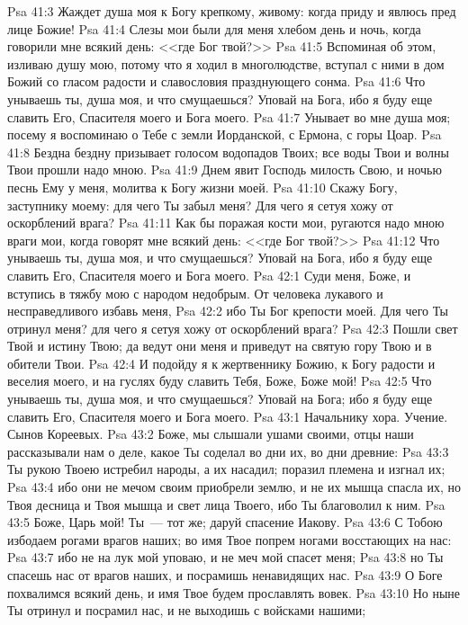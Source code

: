 \vs Psa 41:3 Жаждет душа моя к Богу крепкому, живому: когда приду и явлюсь пред лице Божие!
\vs Psa 41:4 Слезы мои были для меня хлебом день и ночь, когда говорили мне всякий день: <<где Бог твой?>>
\vs Psa 41:5 Вспоминая об этом, изливаю душу мою, потому что я ходил в многолюдстве, вступал с ними в дом Божий со гласом радости и славословия празднующего сонма.
\vs Psa 41:6 Что унываешь ты, душа моя, и что смущаешься? Уповай на Бога, ибо я буду еще славить Его, Спасителя моего и Бога моего.
\vs Psa 41:7 Унывает во мне душа моя; посему я воспоминаю о Тебе с земли Иорданской, с Ермона, с горы Цоар.
\vs Psa 41:8 Бездна бездну призывает голосом водопадов Твоих; все воды Твои и волны Твои прошли надо мною.
\vs Psa 41:9 Днем явит Господь милость Свою, и ночью песнь Ему у меня, молитва к Богу жизни моей.
\vs Psa 41:10 Скажу Богу, заступнику моему: для чего Ты забыл меня? Для чего я сетуя хожу от оскорблений врага?
\vs Psa 41:11 Как бы поражая кости мои, ругаются надо мною враги мои, когда говорят мне всякий день: <<где Бог твой?>>
\vs Psa 41:12 Что унываешь ты, душа моя, и что смущаешься? Уповай на Бога, ибо я буду еще славить Его, Спасителя моего и Бога моего.
\vs Psa 42:1 Суди меня, Боже, и вступись в тяжбу мою с народом недобрым. От человека лукавого и несправедливого избавь меня,
\vs Psa 42:2 ибо Ты Бог крепости моей. Для чего Ты отринул меня? для чего я сетуя хожу от оскорблений врага?
\vs Psa 42:3 Пошли свет Твой и истину Твою; да ведут они меня и приведут на святую гору Твою и в обители Твои.
\vs Psa 42:4 И подойду я к жертвеннику Божию, к Богу радости и веселия моего, и на гуслях буду славить Тебя, Боже, Боже мой!
\vs Psa 42:5 Что унываешь ты, душа моя, и что смущаешься? Уповай на Бога; ибо я буду еще славить Его, Спасителя моего и Бога моего.
\vs Psa 43:1 Начальнику хора. Учение. Сынов Кореевых.
\rsbpar\vs Psa 43:2 Боже, мы слышали ушами своими, отцы наши рассказывали нам о деле, какое Ты соделал во дни их, во дни древние:
\vs Psa 43:3 Ты рукою Твоею истребил народы, а их насадил; поразил племена и изгнал их;
\vs Psa 43:4 ибо они не мечом своим приобрели землю, и не их мышца спасла их, но Твоя десница и Твоя мышца и свет лица Твоего, ибо Ты благоволил к ним.
\vs Psa 43:5 Боже, Царь мой! Ты~--- тот же; даруй спасение Иакову.
\vs Psa 43:6 С Тобою избодаем рогами врагов наших; во имя Твое попрем ногами восстающих на нас:
\vs Psa 43:7 ибо не на лук мой уповаю, и не меч мой спасет меня;
\vs Psa 43:8 но Ты спасешь нас от врагов наших, и посрамишь ненавидящих нас.
\vs Psa 43:9 О Боге похвалимся всякий день, и имя Твое будем прославлять вовек.
\vs Psa 43:10 Но ныне Ты отринул и посрамил нас, и не выходишь с войсками нашими;
